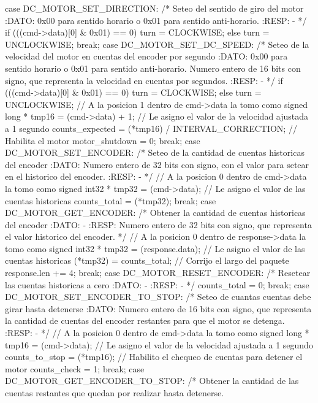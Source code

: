 \documentclass[a4paper,10pt]{article}
\begin{document}
{\begin{verbatimtab}
{{ 		case DC_MOTOR_SET_DIRECTION:
			/* Seteo del sentido de giro del motor
			:DATO:
			0x00 para sentido horario o 0x01 para sentido anti-horario.
			:RESP:
			-
			*/
			if (((cmd->data)[0] & 0x01) == 0)
			{
				turn = CLOCKWISE;
			} else {
				turn = UNCLOCKWISE;
			}
		break;
 		case DC_MOTOR_SET_DC_SPEED:
			/* Seteo de la velocidad del motor en cuentas del encoder por segundo
			:DATO:
			0x00 para sentido horario o 0x01 para sentido anti-horario. Numero 
			entero de 16 bits con signo, que representa la velocidad en cuentas 
			por segundos.
			:RESP:
			-
			*/
			if (((cmd->data)[0] & 0x01) == 0)
			{
				turn = CLOCKWISE;
			} else {
				turn = UNCLOCKWISE;
			}
			// A la posicion 1 dentro de cmd->data la tomo como signed long *
			tmp16 = (cmd->data) + 1;
			// Le asigno el valor de la velocidad ajustada a 1 segundo
			counts_expected = (*tmp16) / INTERVAL_CORRECTION;
			// Habilita el motor
			motor_shutdown = 0;
		break;
 		case DC_MOTOR_SET_ENCODER:
			/* Seteo de la cantidad de cuentas historicas del encoder
			:DATO:
			Numero entero de 32 bits con signo, con el valor para setear en el
			historico del encoder.
			:RESP:
			-
			*/
			// A la posicion 0 dentro de cmd->data la tomo como signed int32 *
			tmp32 = (cmd->data);
			// Le asigno el valor de las cuentas historicas
			counts_total = (*tmp32);
		break;
 		case DC_MOTOR_GET_ENCODER:
			/* Obtener la cantidad de cuentas historicas del encoder
			:DATO:
			-
			:RESP:
			Numero entero de 32 bits con signo, que representa el valor historico
			del encoder.
			*/
			// A la posicion 0 dentro de response->data la tomo como signed int32 *
			tmp32 = (response.data);
			// Le asigno el valor de las cuentas historicas
			(*tmp32) = counts_total;
			// Corrijo el largo del paquete
			response.len += 4;
		break;
 		case DC_MOTOR_RESET_ENCODER:
			/* Resetear las cuentas historicas a cero
			:DATO:
			-
			:RESP:
			-
			*/
			counts_total = 0;
		break;
 		case DC_MOTOR_SET_ENCODER_TO_STOP:
			/* Seteo de cuantas cuentas debe girar hasta detenerse
			:DATO:
			Numero entero de 16 bits con signo, que representa la cantidad de
			cuentas del encoder restantes para que el motor se detenga.
			:RESP:
			-
			*/
			// A la posicion 0 dentro de cmd->data la tomo como signed long *
			tmp16 = (cmd->data);
			// Le asigno el valor de la velocidad ajustada a 1 segundo
			counts_to_stop = (*tmp16);
			// Habilito el chequeo de cuentas para detener el motor
			counts_check = 1;
		break;
 		case DC_MOTOR_GET_ENCODER_TO_STOP:
			/* Obtener la cantidad de las cuentas restantes que quedan por 
			realizar hasta detenerse.
}}
\end{verbatimtab}}
\end{document}
